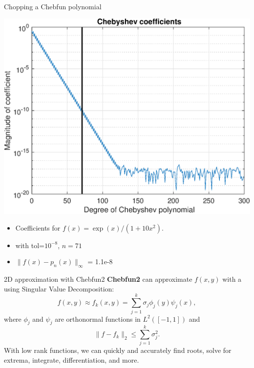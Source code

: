 \documentclass{beamer}
\begin{document}
\begin{frame}{Chopping a Chebfun polynomial}
\begin{center}
\includegraphics[scale = 0.4]{Cheb8.eps}
\end{center}

\begin{center}
\begin{itemize}
\item \begin{center} Coefficients for $f(x)=\exp(x)/(1+10 x^2)$. \end{center}
\item \begin{center} with tol=$10^{-8}$, $n=71$ \end{center}
\item \begin{center} $\| f(x)-p_n(x) \|_{\infty}$ = 1.1e-8 \end{center}
\end{itemize}
\end{center}
\end{frame}

\begin{frame}{2D approximation with Chebfun2}
	\textbf{Chebfun2} can approximate $f(x,y)$ with a using Singular Value Decomposition:
	$$
	f(x,y) \approx f_k(x,y) = \sum_{j=1}^{k} \sigma_j \phi_j(y) \psi_j(x),
	$$	
	where $\phi_j$ and $\psi_j$ are orthonormal functions in $L^2([-1,1])$ and
	$$
	\|f-f_k \|_2 \leq \sum_{j=1}^{k} \sigma_j^2.
	$$
	With low rank functions, we can quickly and accurately find roots, solve for extrema, integrate, differentiation, and more.

\end{frame}
\end{document}
